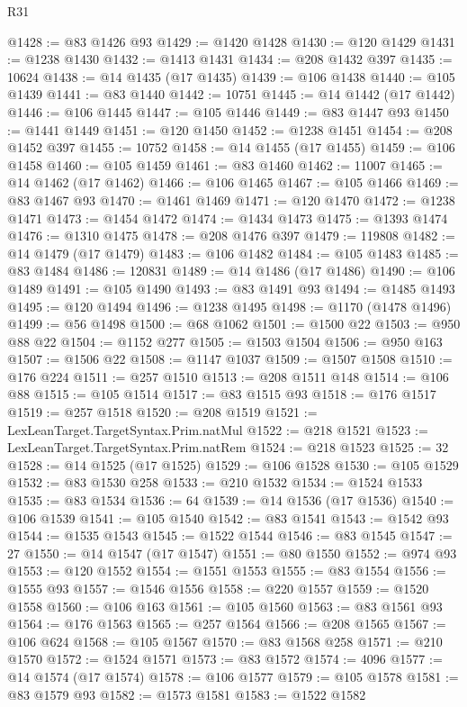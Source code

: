 \begin{lexlean}{R31}
\begin{coremodule}
@1428 := @83 @1426 @93
@1429 := @1420 @1428
@1430 := @120 @1429
@1431 := @1238 @1430
@1432 := @1413 @1431
@1434 := @208 @1432 @397
@1435 := 10624
@1438 := @14 @1435 (@17 @1435)
@1439 := @106 @1438
@1440 := @105 @1439
@1441 := @83 @1440
@1442 := 10751
@1445 := @14 @1442 (@17 @1442)
@1446 := @106 @1445
@1447 := @105 @1446
@1449 := @83 @1447 @93
@1450 := @1441 @1449
@1451 := @120 @1450
@1452 := @1238 @1451
@1454 := @208 @1452 @397
@1455 := 10752
@1458 := @14 @1455 (@17 @1455)
@1459 := @106 @1458
@1460 := @105 @1459
@1461 := @83 @1460
@1462 := 11007
@1465 := @14 @1462 (@17 @1462)
@1466 := @106 @1465
@1467 := @105 @1466
@1469 := @83 @1467 @93
@1470 := @1461 @1469
@1471 := @120 @1470
@1472 := @1238 @1471
@1473 := @1454 @1472
@1474 := @1434 @1473
@1475 := @1393 @1474
@1476 := @1310 @1475
@1478 := @208 @1476 @397
@1479 := 119808
@1482 := @14 @1479 (@17 @1479)
@1483 := @106 @1482
@1484 := @105 @1483
@1485 := @83 @1484
@1486 := 120831
@1489 := @14 @1486 (@17 @1486)
@1490 := @106 @1489
@1491 := @105 @1490
@1493 := @83 @1491 @93
@1494 := @1485 @1493
@1495 := @120 @1494
@1496 := @1238 @1495
@1498 := @1170 (@1478 @1496)
@1499 := @56 @1498
@1500 := @68 @1062
@1501 := @1500 @22
@1503 := @950 @88 @22
@1504 := @1152 @277
@1505 := @1503 @1504
@1506 := @950 @163
@1507 := @1506 @22
@1508 := @1147 @1037
@1509 := @1507 @1508
@1510 := @176 @224
@1511 := @257 @1510
@1513 := @208 @1511 @148
@1514 := @106 @88
@1515 := @105 @1514
@1517 := @83 @1515 @93
@1518 := @176 @1517
@1519 := @257 @1518
@1520 := @208 @1519
@1521 := LexLeanTarget.TargetSyntax.Prim.natMul
@1522 := @218 @1521
@1523 := LexLeanTarget.TargetSyntax.Prim.natRem
@1524 := @218 @1523
@1525 := 32
@1528 := @14 @1525 (@17 @1525)
@1529 := @106 @1528
@1530 := @105 @1529
@1532 := @83 @1530 @258
@1533 := @210 @1532
@1534 := @1524 @1533
@1535 := @83 @1534
@1536 := 64
@1539 := @14 @1536 (@17 @1536)
@1540 := @106 @1539
@1541 := @105 @1540
@1542 := @83 @1541
@1543 := @1542 @93
@1544 := @1535 @1543
@1545 := @1522 @1544
@1546 := @83 @1545
@1547 := 27
@1550 := @14 @1547 (@17 @1547)
@1551 := @80 @1550
@1552 := @974 @93
@1553 := @120 @1552
@1554 := @1551 @1553
@1555 := @83 @1554
@1556 := @1555 @93
@1557 := @1546 @1556
@1558 := @220 @1557
@1559 := @1520 @1558
@1560 := @106 @163
@1561 := @105 @1560
@1563 := @83 @1561 @93
@1564 := @176 @1563
@1565 := @257 @1564
@1566 := @208 @1565
@1567 := @106 @624
@1568 := @105 @1567
@1570 := @83 @1568 @258
@1571 := @210 @1570
@1572 := @1524 @1571
@1573 := @83 @1572
@1574 := 4096
@1577 := @14 @1574 (@17 @1574)
@1578 := @106 @1577
@1579 := @105 @1578
@1581 := @83 @1579 @93
@1582 := @1573 @1581
@1583 := @1522 @1582

\end{coremodule}
\end{lexlean}

